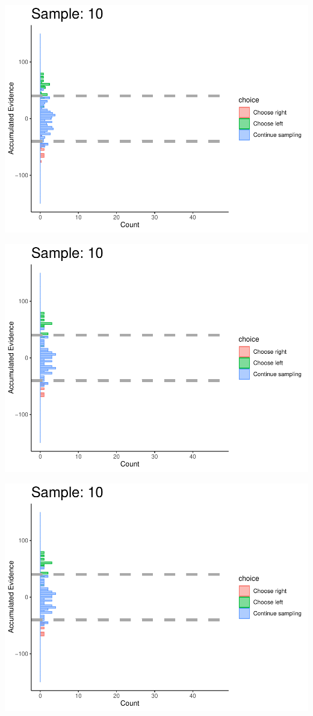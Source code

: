 \documentclass[
]{book}
\begin{document}
\begin{center}\includegraphics[width=0.8\linewidth]{LateNightBayes_files/figure-latex/collapsing_check-89} \end{center}

\begin{center}\includegraphics[width=0.8\linewidth]{LateNightBayes_files/figure-latex/collapsing_check-90} \end{center}

\begin{center}\includegraphics[width=0.8\linewidth]{LateNightBayes_files/figure-latex/collapsing_check-91} \end{center}
\end{document}
